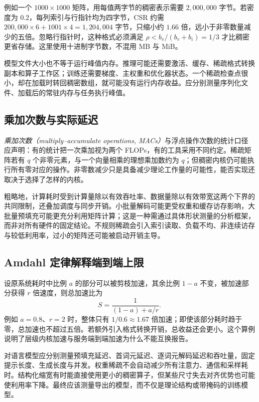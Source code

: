\documentclass[UTF8,12pt,a4paper,fontset=fandol]{ctexart}
\begin{document}
例如一个 $1000\times1000$ 矩阵，用每值两字节的稠密表示需要 $2{,}000{,}000$ 字节。若密度为 $0.2$，每列索引与行指针均为四字节，CSR 约需 $200{,}000\times6+1001\times4=1{,}204{,}004$ 字节，只缩小约 $1.66$ 倍，远小于非零数量减少的五倍。忽略行指针时，这种格式必须满足 $\rho<b_v/(b_v+b_i)=1/3$ 才比稠密更省存储。这里使用十进制字节数，不混用 MB 与 MiB。

模型文件大小也不等于运行峰值内存。推理可能还需要激活、缓存、稀疏格式转换副本和算子工作区；训练还需要梯度、主权重和优化器状态。一个稀疏检查点很小，却在加载时转回稠密数组，就可能没有运行内存收益。应分别测量序列化文件、加载后的常驻内存与任务执行峰值。

\subsection{乘加次数与实际延迟}
\emph{乘加次数（multiply--accumulate operations, MACs）}与浮点操作次数的统计口径应声明：有的统计把一次乘加视为两个 FLOPs，有的工具采用不同约定。稀疏矩阵若有 $q$ 个非零元素，与一个向量相乘的理想乘加数约为 $q$；但稠密内核仍可能执行所有零对应的操作。非零数减少只是具备减少理论工作量的可能性，能否实现还取决于选择了怎样的内核。

粗略地，计算耗时受到计算量除以有效吞吐率、数据量除以有效带宽这两个下界的共同限制，还叠加调度与同步开销。小批量解码可能更受权重和缓存访存影响，大批量预填充可能更充分利用矩阵计算；这是一种需通过具体形状测量的分析框架，而非对所有硬件的固定结论。不规则稀疏会引入索引读取、负载不均、非连续访存与较低利用率，过小的矩阵还可能被启动开销主导。

\subsection{Amdahl 定律解释端到端上限}
设原系统耗时中比例 $a$ 的部分可以被剪枝加速，其余比例 $1-a$ 不变，被加速部分获得 $r$ 倍速度，则总加速比为
\begin{equation}
 S=\frac{1}{(1-a)+a/r}.
 \label{eq:prune-amdahl}
\end{equation}
例如 $a=0.8$、$r=2$ 时，整体只有 $1/0.6\approx1.67$ 倍加速；即使该部分耗时趋于零，总加速也不超过五倍。若额外引入格式转换开销，总收益还会更小。这个算例说明了层级内核加速与服务端到端加速为什么不能互换报告。

对语言模型应分别测量预填充延迟、首词元延迟、逐词元解码延迟和吞吐量，固定提示长度、生成长度与并发。权重稀疏不会自动减少所有注意力、通信和采样耗时。结构化缩宽有时能直接使用更小的稠密算子，但某些尺寸失去对齐优势也可能使利用率下降。最终应该测量导出的模型，而不仅是理论结构或带掩码的训练模型。
\end{document}

